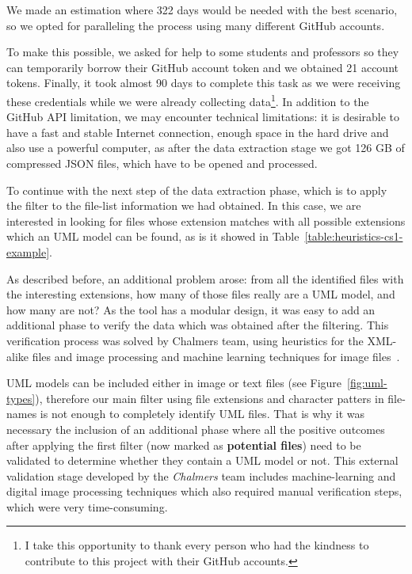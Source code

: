 \documentclass[a4paper, 12pt]{book}
\begin{document}
We made an estimation where 322 days would be needed with the best scenario, so we opted for paralleling the process using many
different GitHub accounts.

To make this possible, we asked for help to some students and professors so they can temporarily borrow their GitHub account
token and we obtained 21 account tokens. Finally, it took almost 90 days to complete this task as we were receiving these credentials
while we were already collecting data\footnote{I take this opportunity to thank every person who had the kindness to contribute to this project
with their GitHub accounts.}.
In addition to the GitHub API limitation, we may encounter technical limitations: it is desirable to have a fast and stable Internet
connection, enough space in the hard drive and also use a powerful computer, as after the data extraction stage we got 126 GB of compressed
JSON files, which have to be opened and processed.

To continue with the next step of the data extraction phase, which is to apply the filter to the file-list information
we had obtained. In this case, we are interested in looking for files whose extension matches with all possible extensions which an
UML model can be found, as is it showed in Table~\ref{table:heuristics-cs1-example}.

As described before, an additional problem arose: from all the identified files with the interesting extensions, how many of those files
really are a UML model, and how many are not? As the tool has a modular design, it was easy to add an additional phase to verify the data
which was obtained after the filtering. This verification process was solved by Chalmers team, using heuristics for the XML-alike files
and image processing and machine learning techniques for image files~\cite{hoquang2014}.

UML models can be included either in image or text files (see Figure~\ref{fig:uml-types}), therefore our main filter using file extensions
and character patters in file-names is not enough to completely identify UML files. That is why it was necessary the inclusion of
an additional phase where all the positive outcomes after applying the first filter (now marked as \textbf{potential files}) need
to be validated to determine whether they contain a UML model or not. This external validation stage developed by the \emph{Chalmers} team
includes machine-learning and digital image processing techniques which also required manual verification steps, which were very time-consuming.
\end{document}
